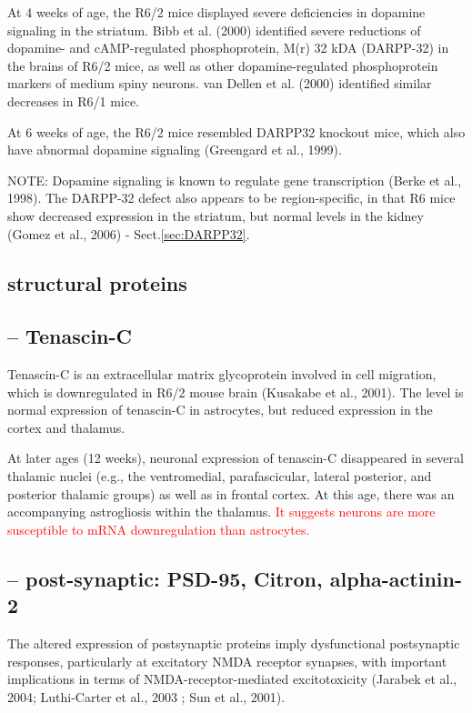 At 4 weeks of age, the R6/2 mice displayed severe deficiencies in dopamine
signaling in the striatum.  Bibb et al. (2000) identified severe reductions of
dopamine- and cAMP-regulated phosphoprotein, M(r) 32 kDA (DARPP-32) in the
brains of R6/2 mice, as well as other dopamine-regulated phosphoprotein markers
of medium spiny neurons. van Dellen et al. (2000) identified similar decreases
in R6/1 mice.

At 6 weeks of age, the R6/2 mice resembled DARPP32 knockout mice, which also
have abnormal dopamine signaling (Greengard et al., 1999).

NOTE: Dopamine signaling is known to regulate gene transcription (Berke et al.,
1998). The DARPP-32 defect also appears to be region-specific, in that R6 mice
show decreased expression in the striatum, but normal levels in the kidney
(Gomez et al., 2006) - Sect.\ref{sec:DARPP32}. 

\subsection{structural proteins}

\subsection{-- Tenascin-C}

Tenascin-C is an extracellular matrix glycoprotein involved in cell migration,
which is downregulated in R6/2 mouse brain (Kusakabe et al., 2001).
The level is normal expression of tenascin-C in astrocytes, but reduced
expression in the cortex and thalamus.

At later ages (12 weeks), neuronal expression of tenascin-C disappeared in
several thalamic nuclei (e.g., the ventromedial, parafascicular, lateral
posterior, and posterior thalamic groups) as well as in frontal cortex.
At this age, there was an accompanying astrogliosis within the thalamus. 
\textcolor{red}{It suggests neurons are more susceptible to mRNA downregulation
than astrocytes.}
 
\subsection{-- post-synaptic: PSD-95, Citron, alpha-actinin-2}

The altered expression of postsynaptic proteins imply dysfunctional postsynaptic
responses, particularly at excitatory NMDA receptor synapses, with important
implications in terms of NMDA-receptor-mediated excitotoxicity (Jarabek et al.,
2004; Luthi-Carter et al., 2003 ;  Sun et al., 2001).

